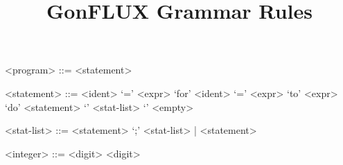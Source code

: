 \documentclass{article}
\title{GonFLUX Grammar Rules}
\begin{document}
\maketitle 

\setlength{\grammarparsep}{20pt plus 1pt minus 1pt} %
\setlength{\grammarindent}{12em} %

\begin{grammar}

<program> ::= <statement>

<statement> ::= <ident> `=' <expr> 
\alt `for' <ident> `=' <expr> `to' <expr> `do' <statement> 
\alt `{' <stat-list> `}' 
\alt <empty> 

<stat-list> ::= <statement> `;' <stat-list> | <statement> 

<integer> ::= <digit> {<digit>}

\end{grammar}
\end{document}
